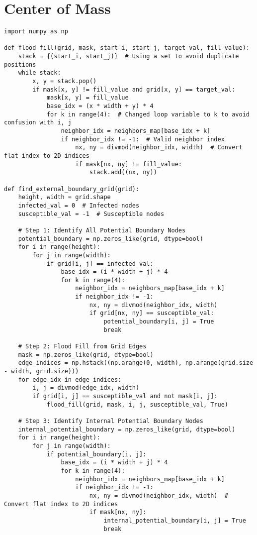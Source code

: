\section{Center of Mass}

\begin{lstlisting}[caption=Center of Mass Algorithm, label=lst:center-of-mass]
import numpy as np

def flood_fill(grid, mask, start_i, start_j, target_val, fill_value):
    stack = {(start_i, start_j)}  # Using a set to avoid duplicate positions
    while stack:
        x, y = stack.pop()
        if mask[x, y] != fill_value and grid[x, y] == target_val:
            mask[x, y] = fill_value
            base_idx = (x * width + y) * 4
            for k in range(4):  # Changed loop variable to k to avoid confusion with i, j
                neighbor_idx = neighbors_map[base_idx + k]
                if neighbor_idx != -1:  # Valid neighbor index
                    nx, ny = divmod(neighbor_idx, width)  # Convert flat index to 2D indices
                    if mask[nx, ny] != fill_value:
                        stack.add((nx, ny))

def find_external_boundary_grid(grid):
    height, width = grid.shape
    infected_val = 0  # Infected nodes
    susceptible_val = -1  # Susceptible nodes

    # Step 1: Identify All Potential Boundary Nodes
    potential_boundary = np.zeros_like(grid, dtype=bool)
    for i in range(height):
        for j in range(width):
            if grid[i, j] == infected_val:
                base_idx = (i * width + j) * 4
                for k in range(4):
                    neighbor_idx = neighbors_map[base_idx + k]
                    if neighbor_idx != -1:
                        nx, ny = divmod(neighbor_idx, width)
                        if grid[nx, ny] == susceptible_val:
                            potential_boundary[i, j] = True
                            break

    # Step 2: Flood Fill from Grid Edges
    mask = np.zeros_like(grid, dtype=bool)
    edge_indices = np.hstack((np.arange(0, width), np.arange(grid.size - width, grid.size)))
    for edge_idx in edge_indices:
        i, j = divmod(edge_idx, width)
        if grid[i, j] == susceptible_val and not mask[i, j]:
            flood_fill(grid, mask, i, j, susceptible_val, True)

    # Step 3: Identify Internal Potential Boundary Nodes
    internal_potential_boundary = np.zeros_like(grid, dtype=bool)
    for i in range(height):
        for j in range(width):
            if potential_boundary[i, j]:
                base_idx = (i * width + j) * 4
                for k in range(4):
                    neighbor_idx = neighbors_map[base_idx + k]
                    if neighbor_idx != -1:
                        nx, ny = divmod(neighbor_idx, width)  # Convert flat index to 2D indices
                        if mask[nx, ny]:
                            internal_potential_boundary[i, j] = True
                            break


\end{lstlisting}

